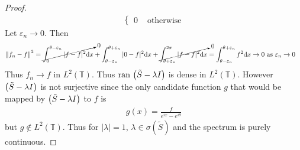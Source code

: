 \documentclass{article} %
\theoremstyle{plain}
\newcommand{\E}{\varepsilon}
\newcommand{\ran}{\text{\rm ran }}
\numberwithin{equation}{section} %
\numberwithin{figure}{section} %
\numberwithin{table}{section} %
\begin{document}
\begin{enumerate}[\it a)]
\begin{proof}
\begin{align*}
\begin{cases}
                    0 & \text{ otherwise}
                \end{cases}
            \end{align*}
            Let $\E_n \rightarrow 0$.  Then
            \begin{align*}
                \norm{f_n - f}^2 = \cancelto{0}{\int_0^{\theta - \E_n} |f - f|^2\dd x} + \int_{\theta-\E_n}^{\theta+\E_n} |0 - f|^2\dd x + \cancelto{0}{\int_{\theta + \E_n}^{2\pi} |f - f|^2\dd x} &= \int_{\theta-\E_n}^{\theta+\E_n}f^2\dd x \rightarrow 0 \text{ as } \E_n \rightarrow 0
            \end{align*}
            Thus $f_n \rightarrow f$ in $L^2(\mathbb{T})$.  Thus $\ran\qty(\tilde{S} - \lambda I)$ is dense in $L^2(\mathbb{T})$.  However $\qty(\tilde{S} - \lambda I)$ is not surjective since the only candidate function $g$ that would be mapped by $\qty(\tilde{S} - \lambda I)$ to $f$ is
            \begin{align*}
                g(x) = \frac{f}{e^{ix} - e^{i\theta}}
            \end{align*}
            but $g \not\in L^2(\mathbb{T})$.  Thus for $|\lambda| = 1$, $\lambda \in \sigma(\tilde{S})$ and the spectrum is purely continuous.
        \end{proof}
\end{enumerate}
\end{document}
